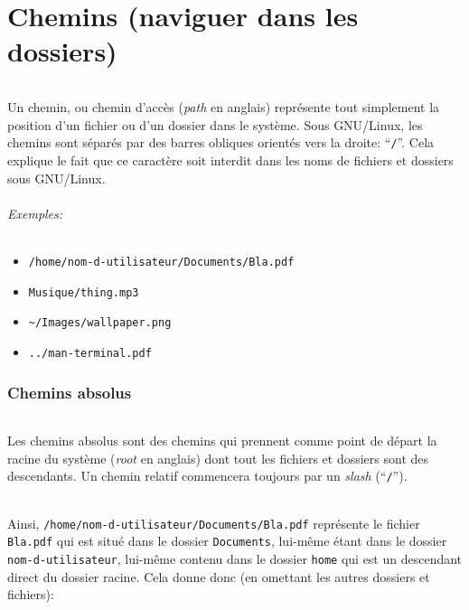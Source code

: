 \part{Chemins (naviguer dans les dossiers)}

\paragraph{} Un chemin, ou chemin d'accès (\emph{path} en anglais) représente
tout simplement la position d'un fichier ou d'un dossier dans le système. Sous
GNU/Linux, les chemins sont séparés par des barres obliques orientés vers la
droite: ``\texttt{/}''.  Cela explique le fait que ce caractère soit interdit
dans les noms de fichiers et dossiers sous GNU/Linux.

\paragraph{Exemples:}

\begin{itemize}
	\item \texttt{/home/nom-d-utilisateur/Documents/Bla.pdf}
	\item \texttt{Musique/thing.mp3}
	\item \texttt{\~{}/Images/wallpaper.png}
	\item \texttt{../man-terminal.pdf}
\end{itemize}

\section{Chemins absolus}

\paragraph{} Les chemins absolus sont des chemins qui prennent comme point de
départ la racine du système (\emph{root} en anglais) dont tout les fichiers et
dossiers sont des descendants. Un chemin relatif commencera toujours par un
\emph{slash} (``\texttt{/}'').

\paragraph{} Ainsi, \texttt{/home/nom-d-utilisateur/Documents/Bla.pdf}
représente le fichier \texttt{Bla.pdf} qui est situé dans le dossier
\texttt{Documents}, lui-même étant dans le dossier \texttt{nom-d-utilisateur},
lui-même contenu dans le dossier \texttt{home} qui est un descendant direct du
dossier racine. Cela donne donc (en omettant les autres dossiers et fichiers):
\\

